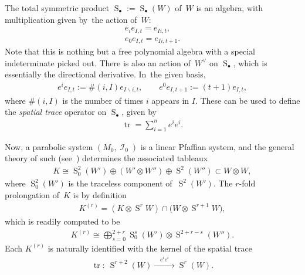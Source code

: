 \documentclass[10pt,a4paper]{amsart}
\DeclareMathOperator{\Sym}{S}
\DeclareMathOperator{\tr}{tr}
\DeclareMathOperator{\I}{\mathcal{I}}
\numberwithin{equation}{section}
\begin{document}
The total symmetric product $\Sym_\bullet := \Sym_\bullet(W)$ of~$W$ is an algebra, with multiplication given by~the action of~$W$:
\begin{gather*}
 e_i e_{I,t} = e_{Ii,t} ,
 \\
 e_0 e_{I,t} = e_{Ii,t+1} .
\end{gather*}
Note that this is nothing but a free polynomial algebra with a special indeterminate picked out.
There is also an action of~$W^\vee$ on $\Sym_\bullet$, which is essentially the directional derivative. In~the given basis,
\begin{gather*}
 e^i e_{I,t} := \#(i,I) e_{I\backslash i,t}, \qquad
 e^0 e_{I,t+1} := (t+1) e_{I,t} ,
\end{gather*}
where $\#(i,I)$ is the number of times $i$ appears in $I$.
These can be used to define the \emph{spatial trace} operator on $\Sym_\bullet$, given by
\begin{gather*}
\tr = \sum_{i=1}^n e^ie^i .
\end{gather*}

Now, a parabolic system $(M_0, \I_0)$ is a linear Pfaffian system, and the general theory of such (see~\cite[Chapter~IV]{BCGGG}) determines the associated tableaux
\begin{gather*}
K \cong \Sym^2_0 (W') \oplus (W'\otimes W'') \oplus \Sym^2 (W'') \subset W \otimes W ,
\end{gather*}
where $\Sym^2_0 (W')$ is the traceless component of~$\Sym^2 (W')$.
The $r$-fold prolongation of~$K$ is by definition
\begin{gather*}
K^{(r)} = (K\otimes \Sym^r W) \cap \big(W \otimes \Sym^{r+1} W\big) ,
\end{gather*}
which is readily computed to be
\begin{gather*}
K^{(r)} \cong \bigoplus_{s = 0}^{2 + r} \Sym^s_0 (W') \otimes \Sym^{2 + r - s} (W'') .
\end{gather*}
Each $K^{(r)}$ is naturally identified with the kernel of the spatial trace
\begin{gather*}
 \tr \colon\ \Sym^{r+2}(W) \xrightarrow{\quad e^{i}e^i \quad} \Sym^{r}(W) .
\end{gather*}
\end{document}
